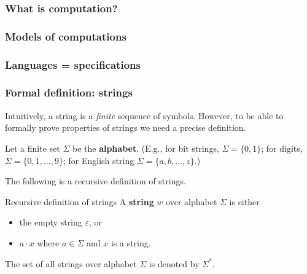 
\renewcommand{\epsilon}{\varepsilon}

\begin{frame}
  \frametitle{What is computation?}
\end{frame}

\begin{frame}
  \frametitle{Models of computations}
\end{frame}

\begin{frame}
  \frametitle{Languages = specifications}
\end{frame}

\begin{frame}
  \frametitle{Formal definition: strings}

  Intuitively, a string is a {\em finite} sequence of symbols.
  However, to be able to formally prove properties of strings we need
  a precise definition.

  \vspace{0.1in}
  
  Let a finite set $\Sigma$ be the {\color{red}\bf alphabet}. (E.g.,
  for bit strings, $\Sigma=\{0,1\}$; for digits,
  $\Sigma=\{0,1,\ldots,9\}$; for English string
  $\Sigma=\{a,b,\ldots,z\}$.)
  
  The following is a recursive definition of strings.

  \begin{block}{Recursive definition of strings}
    A {\color{red} \bf string} $w$ over alphabet $\Sigma$ is either
    \begin{itemize}
    \item the empty string $\epsilon$, or
    \item $a\cdot x$ where $a\in\Sigma$ and $x$ is a string.
    \end{itemize}
  \end{block}

  \vspace{0.1in}

  The set of all strings over alphabet $\Sigma$ is denoted by $\Sigma^*$.
\end{frame}

